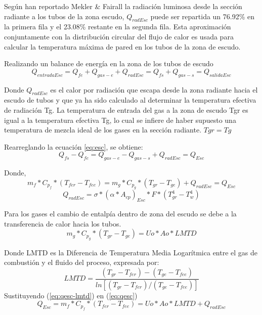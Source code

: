 \par Según  han reportado  Mekler \& Fairall\cite{bib:mekler}  la radiación luminosa desde la sección radiante a los tubos de la zona escudo, $Q_{radEsc}$ puede ser repartida un 76.92\% en la primera fila y el 23.08\% restante en la segunda fila. Esta aproximación conjuntamente con la distribución circular del flujo de calor es usada para calcular la temperatura máxima de pared en los tubos de la zona de escudo.
\par Realizando un balance de energía en la zona de los tubos de escudo
\begin{equation}
\label{eq:esc}
Q_{entradaEsc} = Q_{fe} + Q_{gas-e} + Q_{radEsc} = 
Q_{fs} + Q_{gas-s} = Q_{salidaEsc}
\end{equation}
\par Donde $Q_{radEsc}$ es el calor por radiación que escapa desde la zona radiante hacia el escudo de tubos y que ya ha sido calculado al determinar la temperatura efectiva de radiación Tg. La temperatura de entrada del gas a la zona de escudo Tgr es igual a la temperatura efectiva Tg, lo cual se infiere de haber supuesto una temperatura de mezcla ideal de los gases en la sección radiante. $Tgr = Tg$
\par Rearreglando la ecuación \ref{eq:esc}, se obtiene:
\begin{equation*}
Q_{fs} - Q_{fe} = Q_{gas-e} - Q_{gas-s} + Q_{radEsc} = Q_{Esc}
\end{equation*}
\par Donde,
\begin{equation}
\label{eq:qesc}
m_{f} *C_{p_f} *(T_{fer} - T_{fee}) = 
m_{g} *C_{p_g} *(T_{gr}  - T_{ge}) + Q_{radEsc} = Q_{Esc}
\end{equation}
\begin{equation}
Q_{radEsc} = \sigma *(\alpha *A_{cp} )_{Esc} *F *(T_{gr}^4 -T_w^4)
\end{equation}

\par Para los gases el cambio de entalpía dentro de zona del escudo se debe a la transferencia de calor hacia los tubos.
\begin{equation}
\label{eq:qesc-lmtd}
m_{g} *C_{p_g} *(T_{gr} -T_{ge}) = Uo *Ao *LMTD
\end{equation}

\par Donde LMTD es la Diferencia de Temperatura Media Logarítmica entre el gas de combustión y el fluido del proceso, expresada por:
\begin{equation}
\label{eq:lmtd}
   LMTD = \frac{(T_{gr}-T_{fer}) - (T_{ge}-T_{fee})}
   {ln[(T_{gr}-T_{fer}) /(T_{ge}-T_{fee})]}
\end{equation}
Sustituyendo (\ref{eq:qesc-lmtd}) en (\ref{eq:qesc})
\begin{equation}
\label{eq:tesc}
  Q_{Esc} = m_{f} *C_{p_f} *(T_{fer} - T_{fee}) = Uo *Ao *LMTD + Q_{radEsc}
\end{equation}

